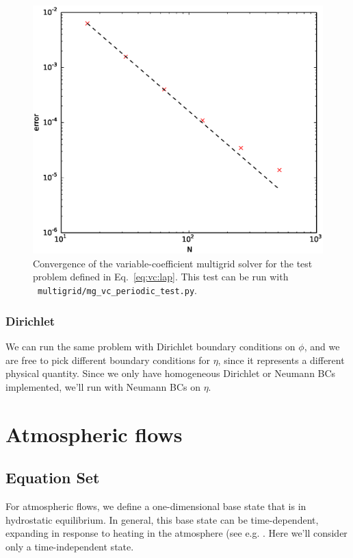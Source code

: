 \begin{figure}[t]
\centering
\includegraphics[width=0.8\linewidth]{mg_vc_converge}
\caption[Convergence of the variable-coefficient Poisson solver]{\label{fig:mg_vc_converge} Convergence of the variable-coefficient
multigrid solver for the test problem defined in Eq.~\ref{eq:vc:lap}.  This test can be
run with \pyro\ {\tt multigrid/mg\_vc\_periodic\_test.py}.}
\end{figure}

\subsubsection{Dirichlet}

We can run the same problem with Dirichlet boundary conditions on $\phi$,
and we are free to pick different boundary conditions for $\eta$, since
it represents a different physical quantity.  Since we only have homogeneous
Dirichlet or Neumann BCs implemented, we'll run with Neumann BCs on $\eta$.



\section{Atmospheric flows}

\subsection{Equation Set}

For atmospheric flows, we define a one-dimensional base state that is
in hydrostatic equilibrium.  In general, this base state can be
time-dependent, expanding in response to heating in the atmosphere
(see e.g. \cite{almgren:2000,ABRZ:II}.  Here we'll consider only a
time-independent state.

